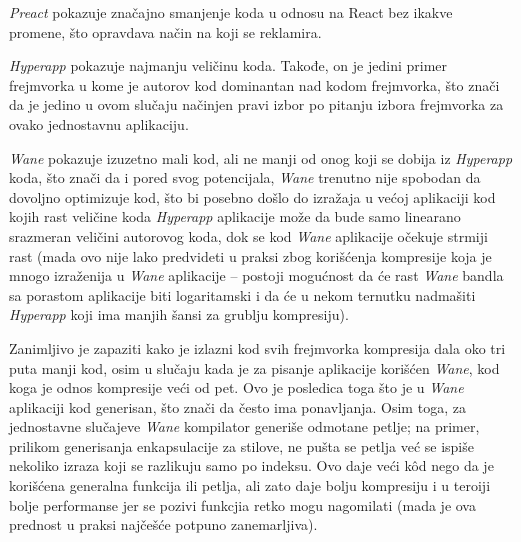 \textsl{Preact} pokazuje značajno smanjenje koda u odnosu na React bez ikakve promene, što opravdava način na koji se reklamira.

\textsl{Hyperapp} pokazuje najmanju veličinu koda.
Takođe, on je jedini primer frejmvorka u kome je autorov kod dominantan nad kodom frejmvorka, što znači da je jedino u ovom slučaju načinjen pravi izbor po pitanju izbora frejmvorka za ovako jednostavnu aplikaciju.

\textsl{Wane} pokazuje izuzetno mali kod, ali ne manji od onog koji se dobija iz \textsl{Hyperapp} koda, što znači da i pored svog potencijala, \textsl{Wane} trenutno nije spobodan da dovoljno optimizuje kod, što bi posebno došlo do izražaja u većoj aplikaciji kod kojih rast veličine koda \textsl{Hyperapp} aplikacije može da bude samo linearano srazmeran veličini autorovog koda, dok se kod \textsl{Wane} aplikacije očekuje strmiji rast (mada ovo nije lako predvideti u praksi zbog korišćenja kompresije koja je mnogo izraženija u \textsl{Wane} aplikacije -- postoji mogućnost da će rast \textsl{Wane} bandla sa porastom aplikacije biti logaritamski i da će u nekom ternutku nadmašiti \textsl{Hyperapp} koji ima manjih šansi za grublju kompresiju).

Zanimljivo je zapaziti kako je izlazni kod svih frejmvorka kompresija dala oko tri puta manji kod, osim u slučaju kada je za pisanje aplikacije korišćen \textsl{Wane}, kod koga je odnos kompresije veći od pet.
Ovo je posledica toga što je u \textsl{Wane} aplikaciji kod generisan, što znači da često ima ponavljanja.
Osim toga, za jednostavne slučajeve \textsl{Wane} kompilator generiše odmotane petlje; na primer, prilikom generisanja enkapsulacije za stilove, ne pušta se petlja već se ispiše nekoliko izraza koji se razlikuju samo po indeksu.
Ovo daje veći kôd nego da je korišćena generalna funkcija ili  petlja, ali zato daje bolju kompresiju i u teroiji bolje performanse jer se pozivi funkcjia retko mogu nagomilati (mada je ova prednost u praksi najčešće potpuno zanemarljiva).

